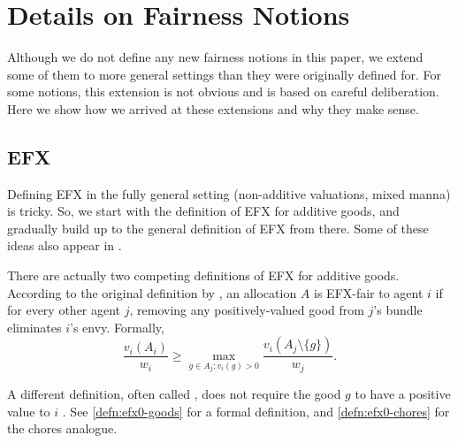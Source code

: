 \section{Details on Fairness Notions}
\label{sec:notions-extra}

Although we do not define any new fairness notions in this paper,
we extend some of them to more general settings than they were originally defined for.
For some notions, this extension is not obvious and is based on careful deliberation.
Here we show how we arrived at these extensions and why they make sense.

\subsection{EFX}
\label{sec:notions:efx}

Defining EFX in the fully general setting (non-additive valuations, mixed manna) is tricky.
So, we start with the definition of EFX for additive goods,
and gradually build up to the general definition of EFX from there.
Some of these ideas also appear in \citet{caragiannis2022existence}.

There are actually two competing definitions of EFX for additive goods.
According to the original definition by \citet{caragiannis2019unreasonable},
an allocation $A$ is EFX-fair to agent $i$ if for every other agent $j$,
removing any positively-valued good from $j$'s bundle eliminates $i$'s envy. Formally,
\[ \frac{v_i(A_i)}{w_i} \ge \max_{g \in A_j: v_i(g) > 0} \frac{v_i(A_j \setminus \{g\})}{w_j}. \]

A different definition, often called \EFXZero{},
does not require the good $g$ to have a positive value to $i$ \citep{plaut2020almost}.
See \cref{defn:efx0-goods} for a formal definition,
and \cref{defn:efx0-chores} for the chores analogue.



